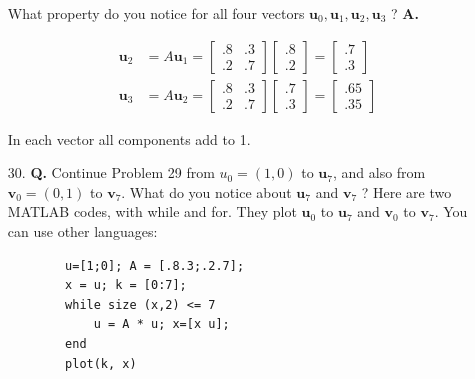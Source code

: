 \documentclass[main.tex]{subfiles}
\begin{document}
\begin{enumerate}
        What property do you notice for all four vectors $\boldsymbol{u}_{0}, \boldsymbol{u}_{1}, \boldsymbol{u}_{2}, \boldsymbol{u}_{3}$ ? \textbf{A.}
        
        $$
        \begin{aligned}
        \bm{u}_2 & = A \bm{u}_1 
        = \left[\begin{array}{ll}
        .8 & .3 \\
        .2 & .7
        \end{array}\right]\left[\begin{array}{l}
        .8 \\
        .2
        \end{array}\right]
        = \left[\begin{array}{l}
        .7 \\
        .3
        \end{array}\right] \\
        \bm{u}_3 & = A\bm{u}_2
        =\left[\begin{array}{ll}
        .8 & .3 \\
        .2 & .7
        \end{array}\right]\left[\begin{array}{l}
        .7 \\
        .3
        \end{array}\right]
        = \left[\begin{array}{l}
        .65 \\
        .35
        \end{array}\right]
        \end{aligned}
        $$
        
        In each vector all components add to 1.
        
        \item [30.] \textbf{Q.} Continue Problem 29 from $u_{0}=(1,0)$ to $\boldsymbol{u}_{7}$, and also from $\boldsymbol{v}_{0}=(0,1)$ to $\boldsymbol{v}_{7}$. What do you notice about $\boldsymbol{u}_{7}$ and $\boldsymbol{v}_{7}$ ? Here are two MATLAB codes, with while and for. They plot $\boldsymbol{u}_{0}$ to $\boldsymbol{u}_{7}$ and $\boldsymbol{v}_{0}$ to $\boldsymbol{v}_{7}$. You can use other languages:
        
        \begin{lstlisting}
        u=[1;0]; A = [.8.3;.2.7];
        x = u; k = [0:7];
        while size (x,2) <= 7
            u = A * u; x=[x u];
        end
        plot(k, x)
        \end{lstlisting}
        

\end{enumerate}
\end{document}
